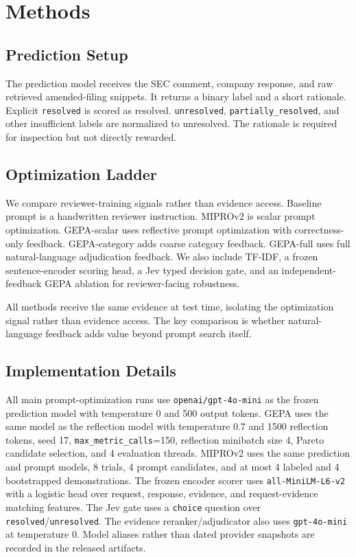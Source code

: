 \documentclass[11pt]{article}
\begin{document}
\section{Methods}

\subsection{Prediction Setup}

The prediction model receives the SEC comment, company response, and raw retrieved amended-filing snippets. It returns a binary label and a short rationale. Explicit \texttt{resolved} is scored as resolved. \texttt{unresolved}, \texttt{partially\_resolved}, and other insufficient labels are normalized to unresolved. The rationale is required for inspection but not directly rewarded.

\subsection{Optimization Ladder}

We compare reviewer-training signals rather than evidence access. Baseline prompt is a handwritten reviewer instruction. MIPROv2 is scalar prompt optimization. GEPA-scalar uses reflective prompt optimization with correctness-only feedback. GEPA-category adds coarse category feedback. GEPA-full uses full natural-language adjudication feedback. We also include TF-IDF, a frozen sentence-encoder scoring head, a Jev typed decision gate, and an independent-feedback GEPA ablation for reviewer-facing robustness.

All methods receive the same evidence at test time, isolating the optimization signal rather than evidence access. The key comparison is whether natural-language feedback adds value beyond prompt search itself.

\subsection{Implementation Details}

All main prompt-optimization runs use \texttt{openai/gpt-4o-mini} as the frozen prediction model with temperature 0 and 500 output tokens. GEPA uses the same model as the reflection model with temperature 0.7 and 1500 reflection tokens, seed 17, \texttt{max\_metric\_calls}=150, reflection minibatch size 4, Pareto candidate selection, and 4 evaluation threads. MIPROv2 uses the same prediction and prompt models, 8 trials, 4 prompt candidates, and at most 4 labeled and 4 bootstrapped demonstrations. The frozen encoder scorer uses \texttt{all-MiniLM-L6-v2} with a logistic head over request, response, evidence, and request-evidence matching features. The Jev gate uses a \texttt{choice} question over \texttt{resolved}/\texttt{unresolved}. The evidence reranker/adjudicator also uses \texttt{gpt-4o-mini} at temperature 0. Model aliases rather than dated provider snapshots are recorded in the released artifacts.
\end{document}
